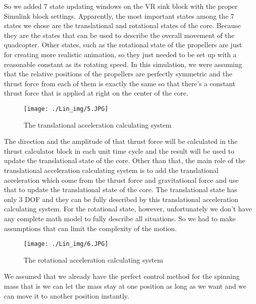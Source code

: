 So we added 7 state updating windows on the VR sink block with the proper Simulink block settings.
\newline
\newline
Apparently, the most important states among the 7 states we chose are the translational and rotational states of the core. Because they are the states that can be used to describe the overall movement of the quadcopter. 
\newline
\newline
Other states, such as the rotational state of the propellers are just for creating more realistic animation, so they just needed to be set up with a reasonable constant as its rotating speed. 
\newline
\newline
In this simulation, we were assuming that the relative positions of the propellers are perfectly symmetric and the thrust force from each of them is exactly the same so that there’s a constant thrust force that is applied at right on the center of the core.
\begin{figure}[h]
\centering
\texttt{[image: ./Lin\_img/5.JPG]}
\caption{The translational acceleration calculating system}
\end{figure}
\newline
The direction and the amplitude of that thrust force will be calculated in the thrust calculator block in each unit time cycle and the result will be used to update the translational state of the core.
\newline
\newline
Other than that, the main role of the translational acceleration calculating system is to add the translational acceleration which come from the thrust force and gravitational force and use that to update the translational state of the core. The translational state has only 3 DOF and they can be fully described by this translational acceleration  calculating system.
\newline
\newline
For the rotational state, however, unfortunately we don’t have any complete math model to fully describe all situations. So we had to make assumptions that can limit the complexity of the motion. 
\begin{figure}[h]
\centering
\texttt{[image: ./Lin\_img/6.JPG]}
\caption{The rotational acceleration calculating system}
\end{figure}
\newline
We assumed that we already have the perfect control method for the spinning mass that is we can let the mass stay at one position as long as we want and we can move it to another position instantly.
